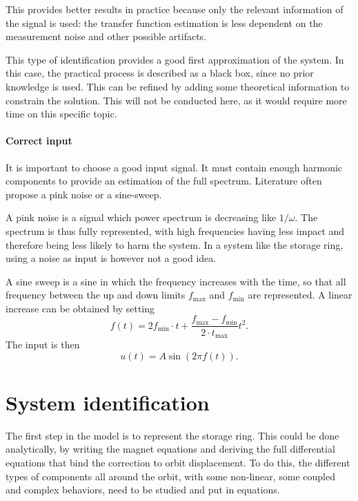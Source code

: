 This provides better results in practice because only the relevant information of the signal is used: the transfer function estimation is less dependent on the measurement noise and other possible artifacts.

This type of identification provides a good first approximation of the system. In this case, the practical process is described as a black box, since no prior knowledge is used. This can be refined by adding some theoretical information to constrain the solution. This will not be conducted here, as it would require more time on this specific topic.

\paragraph{Correct input}
It is important to choose a good input signal. It must contain enough harmonic components to provide an estimation of the full spectrum. Literature often propose a pink noise or a sine-sweep.

A pink noise is a signal which power spectrum is decreasing like $1/\omega$. The spectrum is thus fully represented, with high frequencies having less impact and therefore being less likely to harm the system. In a system like the storage ring, using a noise as input is however not a good idea. 

A sine sweep is a sine in which the frequency increases with the time, so that all frequency between the up and down limits $f_\text{max}$ and $f_\text{min}$ are represented. A linear increase can be obtained by setting
\begin{equation}
	f(t) = 2 f_\text{min} \cdot t + \frac{f_\text{max}-f_\text{min}}{2 \cdot t_\text{max}} t^2.
\end{equation}
The input is then
\begin{equation}
	u(t) = A \sin(2\pi f(t)).
\end{equation}

\section{System identification}
The first step in the model is to represent the storage ring. This could be done analytically, by writing the magnet equations and deriving the full differential equations that bind the correction to orbit displacement. To do this, the different types of components all around the orbit, with some non-linear, some coupled and complex behaviors, need to be studied and put in equations.

